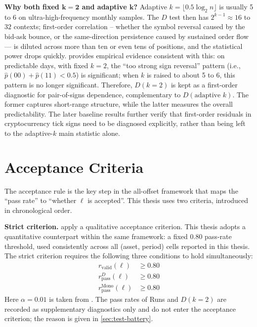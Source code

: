 \documentclass[11pt,titlepage,openany,oneside]{book}  %
\begin{document}
\textbf{Why both fixed $\boldsymbol{k = 2}$ and adaptive $\boldsymbol{k}$?} Adaptive $k = \lfloor 0.5 \log_2 n \rfloor$ is usually 5 to 6 on ultra-high-frequency monthly samples. The $D$ test then has $2^{k-1} \approx 16$ to $32$ contexts; first-order correlation -- whether the symbol reversal caused by the bid-ask bounce, or the same-direction persistence caused by sustained order flow --- is diluted across more than ten or even tens of positions, and the statistical power drops quickly. \citet{shternshis2025predictability} provides empirical evidence consistent with this: on predictable days, with fixed $k = 2$, the ``too strong sign reversal'' pattern (i.e., $\hat{p}(00) + \hat{p}(11) < 0.5$) is significant; when $k$ is raised to about 5 to 6, this pattern is no longer significant. Therefore, $D(k = 2)$ is kept as a first-order diagnostic for pair-of-signs dependence, complementary to $D(\text{adaptive } k)$. The former captures short-range structure, while the latter measures the overall predictability. The later baseline results further verify that first-order residuals in cryptocurrency tick signs need to be diagnosed explicitly, rather than being left to the adaptive-$k$ main statistic alone.

\section{Acceptance Criteria}
\label{sec:acceptance-criteria}

The acceptance rule is the key step in the all-offset framework that maps the ``pass rate'' to ``whether $\ell$ is accepted''. This thesis uses two criteria, introduced in chronological order.

\textbf{Strict criterion.} \citet{onofri2025emergence} apply a qualitative acceptance criterion. This thesis adopts a quantitative counterpart within the same framework: a fixed 0.80 pass-rate threshold, used consistently across all (asset, period) cells reported in this thesis. The strict criterion requires the following three conditions to hold simultaneously:
\begin{equation}
\begin{aligned}
r_{\text{valid}}(\ell)            &\ge 0.80 \\
r_{\text{pass}}^{D}(\ell)         &\ge 0.80 \\
r_{\text{pass}}^{\text{Mono}}(\ell) &\ge 0.80
\end{aligned}
\end{equation}
Here $\alpha = 0.01$ is taken from \citet{onofri2025emergence}. The pass rates of Runs and $D(k = 2)$ are recorded as supplementary diagnostics only and do not enter the acceptance criterion; the reason is given in \cref{sec:test-battery}.
\end{document}
